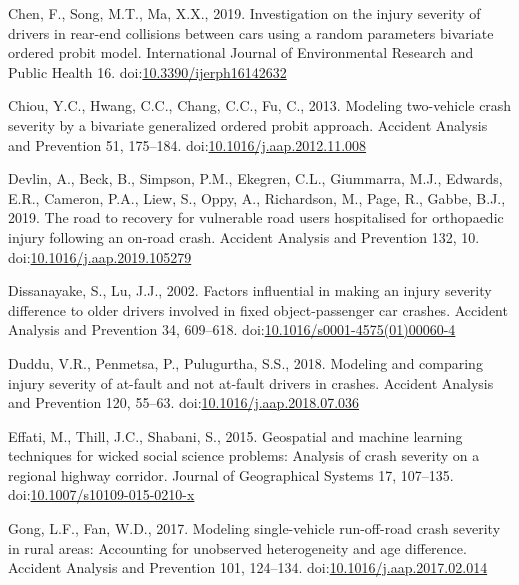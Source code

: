 \documentclass[]{elsarticle} %
\begin{document}
\leavevmode\hypertarget{ref-Chen2019investigation}{}%
Chen, F., Song, M.T., Ma, X.X., 2019. Investigation on the injury
severity of drivers in rear-end collisions between cars using a random
parameters bivariate ordered probit model. International Journal of
Environmental Research and Public Health 16.
doi:\href{https://doi.org/10.3390/ijerph16142632}{10.3390/ijerph16142632}

\leavevmode\hypertarget{ref-Chiou2013modeling}{}%
Chiou, Y.C., Hwang, C.C., Chang, C.C., Fu, C., 2013. Modeling
two-vehicle crash severity by a bivariate generalized ordered probit
approach. Accident Analysis and Prevention 51, 175--184.
doi:\href{https://doi.org/10.1016/j.aap.2012.11.008}{10.1016/j.aap.2012.11.008}

\leavevmode\hypertarget{ref-Devlin2019road}{}%
Devlin, A., Beck, B., Simpson, P.M., Ekegren, C.L., Giummarra, M.J.,
Edwards, E.R., Cameron, P.A., Liew, S., Oppy, A., Richardson, M., Page,
R., Gabbe, B.J., 2019. The road to recovery for vulnerable road users
hospitalised for orthopaedic injury following an on-road crash. Accident
Analysis and Prevention 132, 10.
doi:\href{https://doi.org/10.1016/j.aap.2019.105279}{10.1016/j.aap.2019.105279}

\leavevmode\hypertarget{ref-Dissanayake2002factors}{}%
Dissanayake, S., Lu, J.J., 2002. Factors influential in making an injury
severity difference to older drivers involved in fixed object-passenger
car crashes. Accident Analysis and Prevention 34, 609--618.
doi:\href{https://doi.org/10.1016/s0001-4575(01)00060-4}{10.1016/s0001-4575(01)00060-4}

\leavevmode\hypertarget{ref-Duddu2018modeling}{}%
Duddu, V.R., Penmetsa, P., Pulugurtha, S.S., 2018. Modeling and
comparing injury severity of at-fault and not at-fault drivers in
crashes. Accident Analysis and Prevention 120, 55--63.
doi:\href{https://doi.org/10.1016/j.aap.2018.07.036}{10.1016/j.aap.2018.07.036}

\leavevmode\hypertarget{ref-Effati2015geospatial}{}%
Effati, M., Thill, J.C., Shabani, S., 2015. Geospatial and machine
learning techniques for wicked social science problems: Analysis of
crash severity on a regional highway corridor. Journal of Geographical
Systems 17, 107--135.
doi:\href{https://doi.org/10.1007/s10109-015-0210-x}{10.1007/s10109-015-0210-x}

\leavevmode\hypertarget{ref-Gong2017modeling}{}%
Gong, L.F., Fan, W.D., 2017. Modeling single-vehicle run-off-road crash
severity in rural areas: Accounting for unobserved heterogeneity and age
difference. Accident Analysis and Prevention 101, 124--134.
doi:\href{https://doi.org/10.1016/j.aap.2017.02.014}{10.1016/j.aap.2017.02.014}
\end{document}
